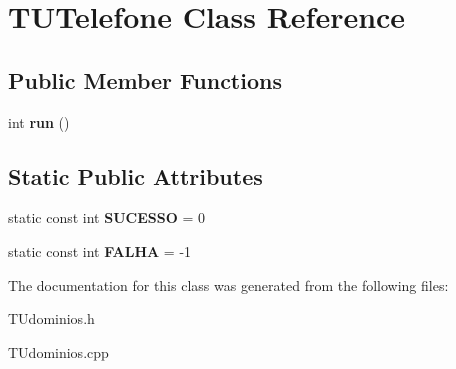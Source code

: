 \hypertarget{classTUTelefone}{}\section{T\+U\+Telefone Class Reference}
\label{classTUTelefone}
\subsection*{Public Member Functions}
\begin{DoxyCompactItemize}
\item 
\mbox{\label{classTUTelefone_abdf98e48a737ab44ad59cc63f26d6788}} 
int {\bfseries run} ()
\end{DoxyCompactItemize}
\subsection*{Static Public Attributes}
\begin{DoxyCompactItemize}
\item 
\mbox{\label{classTUTelefone_a26c0d033f5372652434fdcb5b054c16e}} 
static const int {\bfseries S\+U\+C\+E\+S\+SO} = 0
\item 
\mbox{\label{classTUTelefone_a6bfda7ef5af9266bd5ca1b246002f3c7}} 
static const int {\bfseries F\+A\+L\+HA} = -\/1
\end{DoxyCompactItemize}


The documentation for this class was generated from the following files\+:\begin{DoxyCompactItemize}
\item 
T\+Udominios.\+h\item 
T\+Udominios.\+cpp\end{DoxyCompactItemize}
